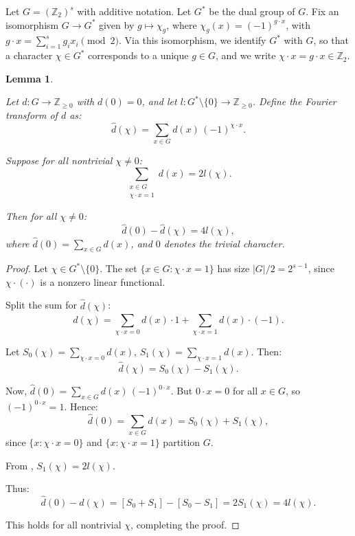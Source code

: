 \documentclass[12pt,twoside,]{amsart}
\theoremstyle{plain}
\newtheorem{lemma}[theorem]{Lemma}
\theoremstyle{definition}
\begin{document}
Let \( G = (\mathbb{Z}_2)^s \) with additive notation.  
Let \( G^* \) be the dual group of \( G \).  
Fix an isomorphism \( G \to G^* \) given by \( g \mapsto \chi_g \), where \( \chi_g(x) = (-1)^{g \cdot x} \), with \( g \cdot x = \sum_{i=1}^s g_i x_i \pmod{2} \).  
Via this isomorphism, we identify \( G^* \) with \( G \), so that a character \( \chi \in G^* \) corresponds to a unique \( g \in G \), and we write \( \chi \cdot x = g \cdot x \in \mathbb{Z}_2 \).

\begin{lemma}\label{lemma: Fourier}


Let \( d: G \to \mathbb{Z}_{\ge 0} \) with \( d(0) = 0 \), and let \( l: G^* \setminus \{0\} \to \mathbb{Z}_{\ge 0} \). Define the Fourier transform of \( d \) as:
\[
\widehat{d}(\chi) = \sum_{x \in G} d(x) \, (-1)^{\chi \cdot x}.
\]

Suppose for all nontrivial \( \chi \neq 0 \):
\begin{equation}\label{l_chi}
\sum_{\substack{x \in G \\ \chi \cdot x = 1}} d(x) = 2 l(\chi). 
\end{equation}

Then for all \( \chi \neq 0 \):
\[
\widehat{d}(0) - \widehat{d}(\chi) = 4 l(\chi),
\]
where \( \widehat{d}(0) = \sum_{x \in G} d(x) \), and \( 0 \) denotes the trivial character.

\end{lemma}

\begin{proof}

Let \( \chi \in G^* \setminus \{0\} \).  
The set \( \{ x \in G : \chi \cdot x = 1 \} \) has size \( |G|/2 = 2^{s-1} \), since \( \chi \cdot (\cdot) \) is a nonzero linear functional.

Split the sum for \( \widehat{d}(\chi) \):
\[
\widehat{d}(\chi) = \sum_{\chi \cdot x = 0} d(x) \cdot 1 + \sum_{\chi \cdot x = 1} d(x) \cdot (-1).
\]

Let \( S_0(\chi) = \sum_{\chi \cdot x = 0} d(x) \), \( S_1(\chi) = \sum_{\chi \cdot x = 1} d(x) \).  
Then:
\[
\widehat{d}(\chi) = S_0(\chi) - S_1(\chi).
\]

Now, \( \widehat{d}(0) = \sum_{x \in G} d(x) \, (-1)^{0 \cdot x} \).  
But \( 0 \cdot x = 0 \) for all \( x \in G \), so \( (-1)^{0 \cdot x} = 1 \).  
Hence:
\[
\widehat{d}(0) = \sum_{x \in G} d(x) = S_0(\chi) + S_1(\chi),
\]
since \( \{x : \chi \cdot x = 0\} \) and \( \{x : \chi \cdot x = 1\} \) partition \( G \).

From , \( S_1(\chi) = 2 l(\chi) \).

Thus:
\[
\widehat{d}(0) - \widehat{d}(\chi) = [S_0 + S_1] - [S_0 - S_1] = 2 S_1(\chi) = 4 l(\chi).
\]

This holds for all nontrivial \( \chi \), completing the proof.

\end{proof}
\end{document}
